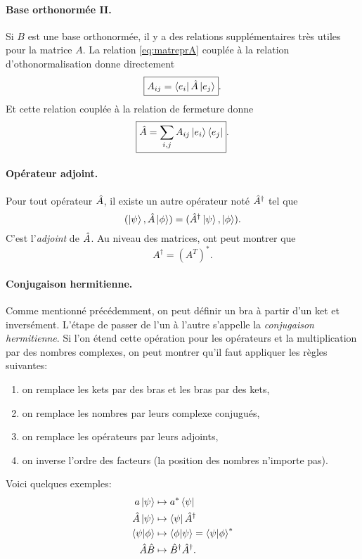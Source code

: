 \documentclass[11pt,a4paper,oneside]{article}
\begin{document}
\paragraph{Base orthonormée  II.} Si $B$ est une base orthonormée, il y a des relations supplémentaires très utiles pour la matrice $A$. La relation \eqref{eq:matreprA} couplée à la relation d'othonormalisation donne directement
\begin{equation}
    \boxed{A_{ij}=\bra{e_i}\hat{A}\ket{e_j}}.
\end{equation}
Et cette relation couplée à la relation de fermeture donne
\begin{equation}
    \boxed{\hat{A}=\sum_{i,j}A_{ij}\ket{e_i}\bra{e_j}}.
\end{equation}

\paragraph{Opérateur adjoint.} Pour tout opérateur $\hat{A}$, il existe un autre opérateur noté $\hat{A}^\dagger$ tel que
\begin{equation}
    (\ket{\psi_{}},\hat{A}\ket{\phi})=(\hat{A}^\dagger\ket{\psi_{}},\ket{\phi}).
\end{equation}
C'est l'\emph{adjoint} de $\hat{A}$. Au niveau des matrices, ont peut montrer que
\begin{equation}
    \boxed{A^\dagger = (A^T)^*}.
\end{equation}

\paragraph{Conjugaison hermitienne.} Comme mentionné précédemment, on peut définir un bra à partir d'un ket et inversément. L'étape de passer de l'un à l'autre s'appelle la \emph{conjugaison hermitienne}. Si l'on étend cette opération pour les opérateurs et la multiplication par des nombres complexes, on peut montrer qu'il faut appliquer les règles suivantes:
\begin{enumerate}
    \item on remplace les kets par des bras et les bras par des kets,
    \item on remplace les nombres par leurs complexe conjugués,
    \item on remplace les opérateurs par leurs adjoints,
    \item on inverse l'ordre des facteurs (la position des nombres n'importe pas).
\end{enumerate}
Voici quelques exemples:
\begin{align}
    a\ket{\psi_{}} &\mapsto a^*\bra{\psi}\\
    \hat{A}\ket{\psi_{}} &\mapsto \bra{\psi}\hat{A}^\dagger\\
    \braket{\psi}{\phi} &\mapsto \braket{\phi}{\psi} = \braket{\psi}{\phi}^*\\
    \hat{A}\hat{B} & \mapsto \hat{B}^\dagger\hat{A}^\dagger.
\end{align}
\end{document}
